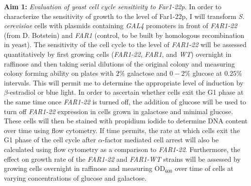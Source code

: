 \documentclass[12pt]{article}
\begin{document}
\textbf{Aim 1:} \emph{Evaluation of yeast cell cycle sensitivity to Far1-22p.}
In order to characterize the sensitivity of growth to the level of Far1-22p, I will transform \emph{S. cerevisiae} cells with plasmids containing \emph{GAL4} promoters in front of \emph{FAR1-22} (from D. Botstein) and \emph{FAR1} (control, to be built by homologous recombination in yeast). The sensitivity of the cell cycle to the level of \emph{FAR1-22} will be assessed quantitatively by first growing cells (\emph{FAR1-22}, \emph{FAR1}, and \emph{WT}) overnight in raffinose and then taking serial dilutions of the original colony and measuring colony forming ability on plates with $2\%$ galactose and $0-2\%$ glucose at $0.25\%$ intervals. This will permit me to determine the appropriate level of induction by $\beta$-estradiol or blue light. In order to ascertain whether cells exit the G1 phase at the same time once \emph{FAR1-22} is turned off, the addition of glucose will be used to turn off \emph{FAR1-22} expression in cells grown in galactose and minimal glucose. These cells will then be stained with propidium iodide to determine DNA content over time using flow cytometry. If time permits, the rate at which cells exit the G1 phase of the cell cycle after $\alpha$-factor mediated cell arrest will also be calculated using flow cytometry as a comparison to \emph{FAR1-22}.  Furthermore, the effect on growth rate of the \emph{FAR1-22} and \emph{FAR1-WT} strains will be assessed by growing cells overnight in raffinose and measuring OD$_{600}$ over time of cells at varying concentrations of glucose and galactose. 
\end{document}
